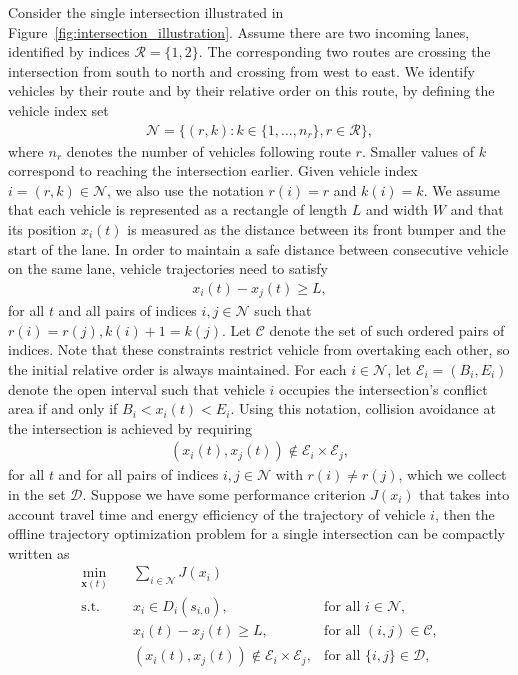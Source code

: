 \documentclass[a4paper]{article}
\theoremstyle{definition}
\theoremstyle{plain}
\begin{document}
Consider the single intersection illustrated in
Figure~\ref{fig:intersection_illustration}. Assume there are two incoming lanes,
identified by indices $\mathcal{R} = \{ 1, 2 \}$. The corresponding two routes
are crossing the intersection from south to north and crossing from west to
east. We identify vehicles by their route and by their relative order on this
route, by defining the vehicle index set
\begin{align}
  \mathcal{N} = \{ (r, k) : k \in \{1, \dots, n_{r}\}, r \in \mathcal{R}\} ,
\end{align}
where $n_{r}$ denotes the number of vehicles following route $r$. Smaller
values of $k$ correspond to reaching the intersection earlier. Given vehicle
index $i = (r, k) \in \mathcal{N}$, we also use the notation $r(i) = r$ and
$k(i) = k$.
%
We assume that each vehicle is represented as a rectangle of length $L$ and
width $W$ and that its position $x_{i}(t)$ is measured as the distance between
its front bumper and the start of the lane. In order to maintain a safe distance
between consecutive vehicle on the same lane, vehicle trajectories need to
satisfy
\begin{align}
  \label{eq:follow_constraints}
  x_{i}(t) - x_{j}(t) \geq L ,
\end{align}
for all $t$ and all pairs of indices $i, j \in \mathcal{N}$ such that
$r(i) = r(j), k(i) + 1 = k(j)$. Let $\mathcal{C}$ denote the set of such ordered
pairs of indices. Note that these constraints restrict vehicle from overtaking
each other, so the initial relative order is always maintained.
%
For each $i \in \mathcal{N}$, let $\mathcal{E}_{i} = (B_{i}, E_{i})$ denote the
open interval such that vehicle $i$ occupies the intersection's conflict area if
and only if $B_{i} < x_{i}(t) < E_{i}$. Using this notation, collision avoidance
at the intersection is achieved by requiring
\begin{align}
  \label{eq:conflict_constraints}
  (x_{i}(t), x_{j}(t)) \notin \mathcal{E}_{i} \times \mathcal{E}_{j} ,
\end{align}
for all $t$ and for all pairs of indices $i, j \in \mathcal{N}$ with
$r(i) \neq r(j)$, which we collect in the set $\mathcal{D}$.
%
Suppose we have some performance criterion $J(x_{i})$ that takes into account
travel time and energy efficiency of the trajectory of vehicle $i$, then the
offline trajectory optimization problem for a single intersection can be
compactly written as
\begin{subequations}
\label{eq:offline_single_intersection}
\begin{align}
  \min_{\mathbf{x}(t)} \quad & \sum_{i \in \mathcal{N}} J(x_{i}) \\
  \text{s.t.} \quad  & x_{i} \in D_{i}(s_{i,0}) , &\text{for all } i \in \mathcal{N} , \\
                & x_{i}(t) - x_{j}(t) \geq L, &\text{for all } (i,j) \in \mathcal{C} , \\
                & (x_{i}(t), x_{j}(t))  \notin \mathcal{E}_{i} \times \mathcal{E}_{j} , &\text{for all } \{i,j\} \in \mathcal{D} \label{eq:collision_constraints} ,
\end{align}
\end{subequations}
\end{document}
